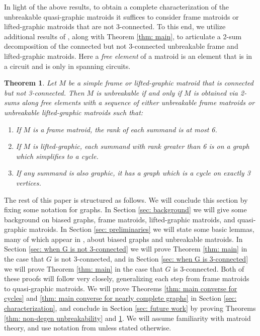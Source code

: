 \documentclass[12pt]{article}
\newtheorem{theorem}{Theorem}[section]
\theoremstyle{definition}
\theoremstyle{plain} %
\begin{document}
In light of the above results, to obtain a complete characterization of the unbreakable quasi-graphic matroids it suffices to consider frame matroids or lifted-graphic matroids that are not $3$-connected. To this end, we utilize additional results of \cite{Oxley-Pfeil2022}, along with Theorem \ref{thm: main}, to articulate a 2-sum decomposition of the connected but not 3-connected unbreakable frame and lifted-graphic matroids. 
Here a \emph{free element} of a matroid is an element that is in a circuit and is only in spanning circuits. 
\begin{theorem}\label{thm: connected not 3-connected}
    Let $M$ be a simple frame or lifted-graphic matroid that is connected but not 3-connected. Then $M$ is unbreakable if and only if $M$ is obtained via 2-sums along free elements with a sequence of either unbreakable frame matroids or unbreakable lifted-graphic matroids such that:
    \begin{enumerate}[$(i)$]
        \item If $M$ is a frame matroid, the rank of each summand is at most 6.
        \item If $M$ is lifted-graphic, each summand with rank greater than 6 is on a graph which simplifies to a cycle.
        \item If any summand is also graphic, it has a graph which is a cycle on exactly 3 vertices.
    \end{enumerate}
\end{theorem}

The rest of this paper is structured as follows.
We will conclude this section by fixing some notation for graphs.
In Section \ref{sec: background} we will give some background on biased graphs, frame matroids, lifted-graphic matroids, and quasi-graphic matroids.
In Section \ref{sec: preliminaries} we will state some basic lemmas, many of which appear in \cite{Fife-Mayhew-Oxley-Semple2020}, about biased graphs and unbreakable matroids.
In Section \ref{sec: when G is not 3-connected} we will prove Theorem \ref{thm: main} in the case that $G$ is not $3$-connected, and in Section \ref{sec: when G is 3-connected} we will prove Theorem \ref{thm: main} in the case that $G$ is $3$-connected.
Both of these proofs will follow \cite{Fife-Mayhew-Oxley-Semple2020} very closely, generalizing each step from frame matroids to quasi-graphic matroids.
We will prove Theorems \ref{thm: main converse for cycles} and \ref{thm: main converse for nearly complete graphs} in Section \ref{sec: characterization}, and conclude in Section \ref{sec: future work} by proving Theorems \ref{thm: non-degen unbreakability} and \ref{thm: connected not 3-connected}.
We will assume familiarity with matroid theory, and use notation from \cite{Oxley2011} unless stated otherwise.
\end{document}
